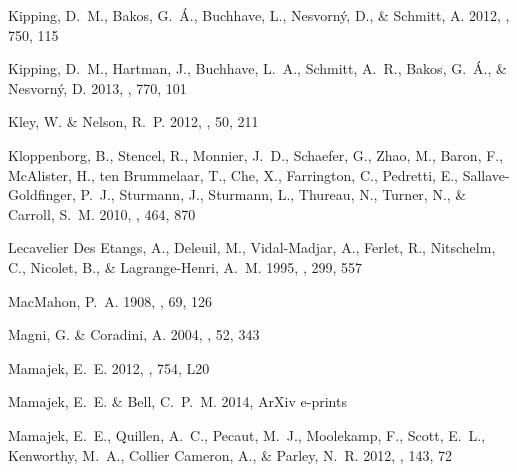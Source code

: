 \documentclass{emulateapj}
\begin{document}
\begin{thebibliography}{45}
{Kipping}, D.~M., {Bakos}, G.~{\'A}., {Buchhave}, L., {Nesvorn{\'y}}, D., \&
  {Schmitt}, A. 2012, \apj, 750, 115

{Kipping}, D.~M., {Hartman}, J., {Buchhave}, L.~A., {Schmitt}, A.~R., {Bakos},
  G.~{\'A}., \& {Nesvorn{\'y}}, D. 2013, \apj, 770, 101

{Kley}, W. \& {Nelson}, R.~P. 2012, \araa, 50, 211

{Kloppenborg}, B., {Stencel}, R., {Monnier}, J.~D., {Schaefer}, G., {Zhao}, M.,
  {Baron}, F., {McAlister}, H., {ten Brummelaar}, T., {Che}, X., {Farrington},
  C., {Pedretti}, E., {Sallave-Goldfinger}, P.~J., {Sturmann}, J., {Sturmann},
  L., {Thureau}, N., {Turner}, N., \& {Carroll}, S.~M. 2010, \nat, 464, 870

{Lecavelier Des Etangs}, A., {Deleuil}, M., {Vidal-Madjar}, A., {Ferlet}, R.,
  {Nitschelm}, C., {Nicolet}, B., \& {Lagrange-Henri}, A.~M. 1995, \aap, 299,
  557

{MacMahon}, P.~A. 1908, \mnras, 69, 126

{Magni}, G. \& {Coradini}, A. 2004, \planss, 52, 343

{Mamajek}, E.~E. 2012, \apjl, 754, L20

{Mamajek}, E.~E. \& {Bell}, C.~P.~M. 2014, ArXiv e-prints

{Mamajek}, E.~E., {Quillen}, A.~C., {Pecaut}, M.~J., {Moolekamp}, F., {Scott},
  E.~L., {Kenworthy}, M.~A., {Collier Cameron}, A., \& {Parley}, N.~R. 2012,
  \aj, 143, 72


\end{thebibliography}
\end{document}
